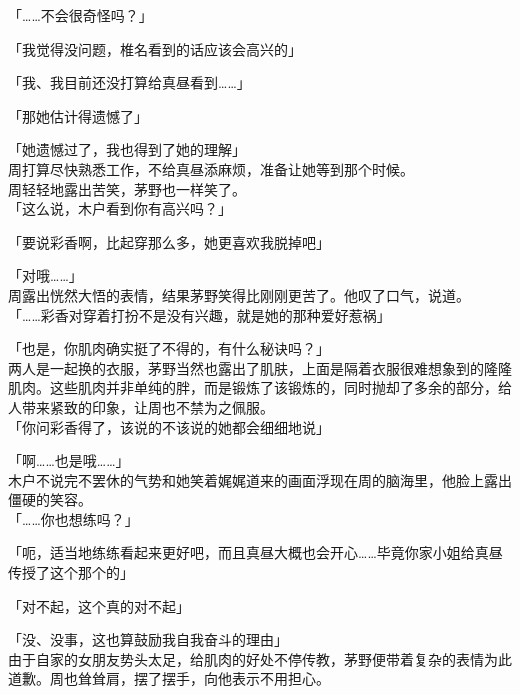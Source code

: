 「……不会很奇怪吗？」

「我觉得没问题，椎名看到的话应该会高兴的」

「我、我目前还没打算给真昼看到……」

「那她估计得遗憾了」

「她遗憾过了，我也得到了她的理解」\\

周打算尽快熟悉工作，不给真昼添麻烦，准备让她等到那个时候。\\

周轻轻地露出苦笑，茅野也一样笑了。\\

「这么说，木户看到你有高兴吗？」

「要说彩香啊，比起穿那么多，她更喜欢我脱掉吧」

「对哦……」\\

周露出恍然大悟的表情，结果茅野笑得比刚刚更苦了。他叹了口气，说道。\\

「……彩香对穿着打扮不是没有兴趣，就是她的那种爱好惹祸」

「也是，你肌肉确实挺了不得的，有什么秘诀吗？」\\

两人是一起换的衣服，茅野当然也露出了肌肤，上面是隔着衣服很难想象到的隆隆肌肉。这些肌肉并非单纯的胖，而是锻炼了该锻炼的，同时抛却了多余的部分，给人带来紧致的印象，让周也不禁为之佩服。\\

「你问彩香得了，该说的不该说的她都会细细地说」

「啊……也是哦……」\\

木户不说完不罢休的气势和她笑着娓娓道来的画面浮现在周的脑海里，他脸上露出僵硬的笑容。\\

「……你也想练吗？」

「呃，适当地练练看起来更好吧，而且真昼大概也会开心……毕竟你家小姐给真昼传授了这个那个的」

「对不起，这个真的对不起」

「没、没事，这也算鼓励我自我奋斗的理由」\\

由于自家的女朋友势头太足，给肌肉的好处不停传教，茅野便带着复杂的表情为此道歉。周也耸耸肩，摆了摆手，向他表示不用担心。
